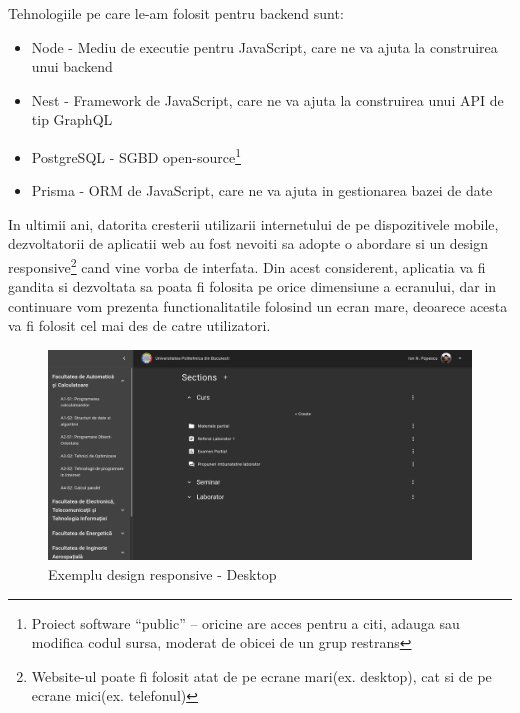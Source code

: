 \documentclass[12pt, a4paper, oneside, romanian]{teza-upb}
\begin{document}
Tehnologiile pe care le-am folosit pentru backend sunt:
\begin{itemize}
	\item Node - Mediu de executie pentru JavaScript, care ne va ajuta la construirea unui backend
	\item Nest - Framework de JavaScript, care ne va ajuta la construirea unui API de tip GraphQL
	\item PostgreSQL - SGBD open-source\footnote{Proiect software ``public'' -- oricine are acces pentru a citi, adauga sau modifica codul sursa, moderat de obicei de un grup restrans}
	\item Prisma - ORM de JavaScript, care ne va ajuta in gestionarea bazei de date
\end{itemize}

In ultimii ani, datorita cresterii utilizarii internetului de pe dispozitivele mobile, dezvoltatorii de aplicatii web au fost nevoiti sa adopte o abordare si un design responsive\footnote{Website-ul poate fi folosit atat de pe ecrane mari(ex. desktop), cat si de pe ecrane mici(ex. telefonul)} cand vine vorba de interfata. Din acest considerent, aplicatia va fi gandita si dezvoltata sa poata fi folosita pe orice dimensiune a ecranului, dar in continuare vom prezenta functionalitatile folosind un ecran mare, deoarece acesta va fi folosit cel mai des de catre utilizatori.

\begin{figure}[H]
\centering
\includegraphics*[width=\columnwidth]{exemplu-design-responsive-desktop}
\caption{Exemplu design responsive - Desktop}
\label{exemplu-design-responsive-desktop}
\end{figure}
\end{document}
